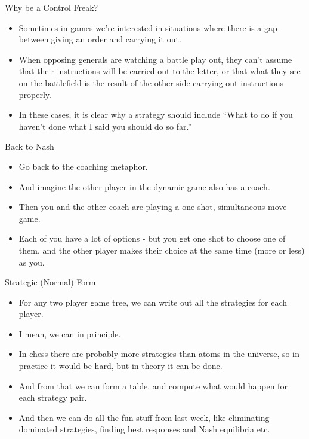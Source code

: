 \documentclass[
  ignorenonframetext,
]{beamer}
\providecommand{\tightlist}{%
  \setlength{\itemsep}{0pt}\setlength{\parskip}{0pt}}
\begin{document}
\begin{frame}{Why be a Control Freak?}
\protect\hypertarget{why-be-a-control-freak-1}{}
\begin{itemize}
\tightlist
\item
  Sometimes in games we're interested in situations where there is a gap
  between giving an order and carrying it out.
\item
  When opposing generals are watching a battle play out, they can't
  assume that their instructions will be carried out to the letter, or
  that what they see on the battlefield is the result of the other side
  carrying out instructions properly.
\item
  In these cases, it is clear why a strategy should include ``What to do
  if you haven't done what I said you should do so far.''
\end{itemize}
\end{frame}

\begin{frame}{Back to Nash}
\protect\hypertarget{back-to-nash}{}
\begin{itemize}
\tightlist
\item
  Go back to the coaching metaphor.
\item
  And imagine the other player in the dynamic game also has a coach.
\item
  Then you and the other coach are playing a one-shot, simultaneous move
  game.
\item
  Each of you have a lot of options - but you get one shot to choose one
  of them, and the other player makes their choice at the same time
  (more or less) as you.
\end{itemize}
\end{frame}

\begin{frame}{Strategic (Normal) Form}
\protect\hypertarget{strategic-normal-form}{}
\begin{itemize}
\tightlist
\item
  For any two player game tree, we can write out all the strategies for
  each player.
\item
  I mean, we can in principle.
\item
  In chess there are probably more strategies than atoms in the
  universe, so in practice it would be hard, but in theory it can be
  done.
\item
  And from that we can form a table, and compute what would happen for
  each strategy pair.
\item
  And then we can do all the fun stuff from last week, like eliminating
  dominated strategies, finding best responses and Nash equilibria etc.
\end{itemize}
\end{frame}
\end{document}
